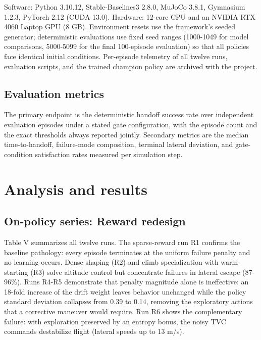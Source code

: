 \documentclass[11pt,a4paper]{article}
\begin{document}
Software: Python 3.10.12, Stable-Baselines3 2.8.0, MuJoCo 3.8.1, Gymnasium 1.2.3, PyTorch 2.12 (CUDA 13.0). Hardware: 12-core CPU and an NVIDIA RTX 4060 Laptop GPU (8 GB). Environment resets use the framework's seeded generator; deterministic evaluations use fixed seed ranges (1000-1049 for model comparisons, 5000-5099 for the final 100-episode evaluation) so that all policies face identical initial conditions. Per-episode telemetry of all twelve runs, evaluation scripts, and the trained champion policy are archived with the project.


\subsection{Evaluation metrics}

The primary endpoint is the deterministic handoff success rate over independent evaluation episodes under a stated gate configuration, with the episode count and the exact thresholds always reported jointly. Secondary metrics are the median time-to-handoff, failure-mode composition, terminal lateral deviation, and gate-condition satisfaction rates measured per simulation step.


\section{Analysis and results}


\subsection{On-policy series: Reward redesign}

Table V summarizes all twelve runs. The sparse-reward run R1 confirms the baseline pathology: every episode terminates at the uniform failure penalty and no learning occurs. Dense shaping (R2) and climb specialization with warm-starting (R3) solve altitude control but concentrate failures in lateral escape (87-96\%). Runs R4-R5 demonstrate that penalty magnitude alone is ineffective: an 18-fold increase of the drift weight leaves behavior unchanged while the policy standard deviation collapses from 0.39 to 0.14, removing the exploratory actions that a corrective maneuver would require. Run R6 shows the complementary failure: with exploration preserved by an entropy bonus, the noisy TVC commands destabilize flight (lateral speeds up to 13 m/s).
\end{document}
